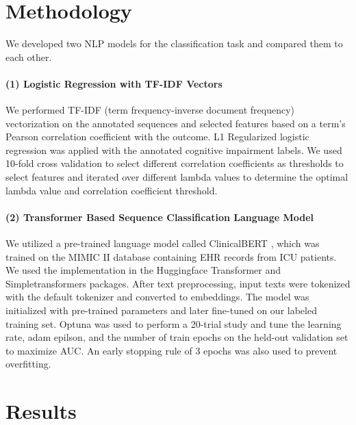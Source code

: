 \documentclass[pmlr,twocolumn,10pt]{jmlr} %
\begin{document}
\section{Methodology}

We developed two NLP models for the classification task and compared them to each other.

\label{sec:TFIDF}  
\paragraph{(1) Logistic Regression with TF-IDF Vectors} We performed TF-IDF (term frequency-inverse document frequency) vectorization on the annotated sequences and selected features based on a term's Pearson correlation coefficient with the outcome. L1 Regularized logistic regression \citep{tibshirani1996regression} was applied with the annotated cognitive impairment labels. We used 10-fold cross validation to select different correlation coefficients as thresholds to select features and iterated over different lambda values to determine the optimal lambda value and correlation coefficient threshold. 


\label{sec:Transformer}  
\paragraph{(2) Transformer Based Sequence Classification Language Model} We utilized a pre-trained language model called ClinicalBERT \citep{alsentzer2019publicly}, which was trained on the MIMIC II database containing EHR records from ICU patients. We used the implementation in the Huggingface Transformer \citep{Wolf2019HuggingFacesTS} and Simpletransformers \citep{simple2020thilina} packages. After text preprocessing, input texts were tokenized with the default tokenizer and converted to embeddings. The model was initialized with pre-trained parameters and later fine-tuned on our labeled training set. Optuna \citep{akiba2019optuna} was used to perform a 20-trial study and tune the learning rate, adam epilson, and the number of train epochs on the held-out validation set to maximize AUC. An early stopping rule of 3 epochs was also used to prevent overfitting. 

\section{Results}
\label{sec:Results}  
\end{document}
